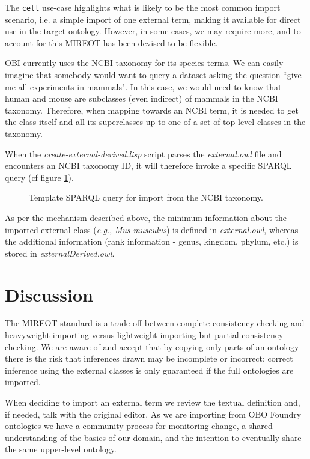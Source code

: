 \documentclass[a4paper,10pt,twocolumn]{article}
\begin{document}
The \texttt{cell} use-case highlights what is likely to be the most common import scenario, i.e. a simple import of one external term, making it available for direct use in the target ontology.
However, in some cases, we may require more, and to account for this \ac{MIREOT} has been devised to be flexible.

OBI currently uses the NCBI taxonomy for its species terms.
We can easily imagine that somebody would want to query a dataset asking the question ``give me all experiments in mammals".
In this case, we would need to know that human and mouse are subclasses (even indirect) of mammals in the NCBI taxonomy.
Therefore, when mapping towards an NCBI term, it is needed to get the class itself and all its superclasses up to one of a set of top-level classes in the taxonomy.

When the \emph{create-external-derived.lisp} script parses the \emph{external.owl} file and encounters an NCBI taxonomy ID, it will therefore invoke a specific SPARQL query (cf figure \ref{fig:sparql2}). 
\begin{figure}[t]
\scriptsize
 
\caption{Template SPARQL query for import from the NCBI taxonomy.}
\label{fig:sparql2}
\end{figure}
As per the mechanism described above, the minimum information about the imported external class (\emph{e.g.}, \emph{Mus musculus}) is defined in \emph{external.owl}, whereas the additional information (rank information - genus, kingdom, phylum, etc.) is stored in \emph{ externalDerived.owl}. 

\section*{Discussion}


The MIREOT standard is a trade-off between complete consistency checking and heavyweight importing versus lightweight importing but partial consistency checking.
We are aware of and accept that by copying only parts of an ontology there is the risk that inferences drawn may be incomplete or incorrect: correct inference using the external classes is only guaranteed if the full ontologies are imported.

When deciding to import an external term we review the textual definition and, if needed, talk with the original editor.
As we are importing from OBO Foundry ontologies we have a community process for monitoring change, a shared understanding of the basics of our domain, and the intention to eventually share the same upper-level ontology. 
\end{document}
